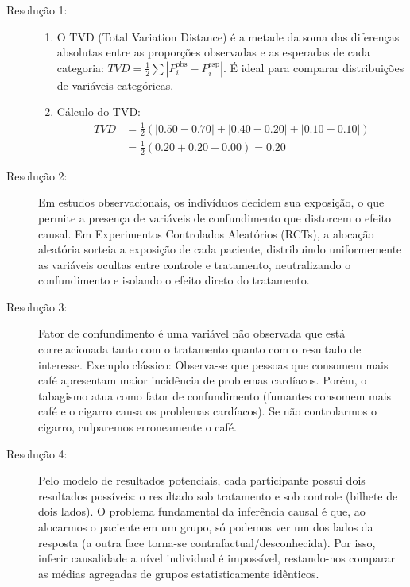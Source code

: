 \documentclass[12pt]{article}
\begin{document}
\begin{description}
    \item[Resolução 1:] 
    \begin{enumerate}[label=\alph*)]
        \item O TVD (Total Variation Distance) é a metade da soma das diferenças absolutas entre as proporções observadas e as esperadas de cada categoria: $TVD = \frac{1}{2}\sum |P_i^{\text{obs}} - P_i^{\text{esp}}|$. É ideal para comparar distribuições de variáveis categóricas.
        \item Cálculo do TVD:
        \begin{align*}
        TVD &= \frac{1}{2} \left( |0.50 - 0.70| + |0.40 - 0.20| + |0.10 - 0.10| \right) \\
        &= \frac{1}{2} (0.20 + 0.20 + 0.00) = \mathbf{0.20}
        \end{align*}
    \end{enumerate}

    \item[Resolução 2:] Em estudos observacionais, os indivíduos decidem sua exposição, o que permite a presença de variáveis de confundimento que distorcem o efeito causal. Em Experimentos Controlados Aleatórios (RCTs), a alocação aleatória sorteia a exposição de cada paciente, distribuindo uniformemente as variáveis ocultas entre controle e tratamento, neutralizando o confundimento e isolando o efeito direto do tratamento.

    \item[Resolução 3:] Fator de confundimento é uma variável não observada que está correlacionada tanto com o tratamento quanto com o resultado de interesse. Exemplo clássico: Observa-se que pessoas que consomem mais café apresentam maior incidência de problemas cardíacos. Porém, o tabagismo atua como fator de confundimento (fumantes consomem mais café e o cigarro causa os problemas cardíacos). Se não controlarmos o cigarro, culparemos erroneamente o café.

    \item[Resolução 4:] Pelo modelo de resultados potenciais, cada participante possui dois resultados possíveis: o resultado sob tratamento e sob controle (bilhete de dois lados). O problema fundamental da inferência causal é que, ao alocarmos o paciente em um grupo, só podemos ver um dos lados da resposta (a outra face torna-se contrafactual/desconhecida). Por isso, inferir causalidade a nível individual é impossível, restando-nos comparar as médias agregadas de grupos estatisticamente idênticos.


\end{description}
\end{document}
